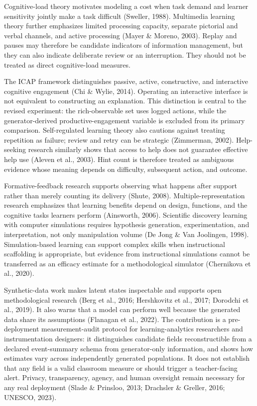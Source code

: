 \documentclass[11pt]{article}
\begin{document}
Cognitive-load theory motivates modeling a cost when task demand and learner sensitivity jointly make a task difficult (Sweller, 1988). Multimedia learning theory further emphasizes limited processing capacity, separate pictorial and verbal channels, and active processing (Mayer \& Moreno, 2003). Replay and pauses may therefore be candidate indicators of information management, but they can also indicate deliberate review or an interruption. They should not be treated as direct cognitive-load measures.

The ICAP framework distinguishes passive, active, constructive, and interactive cognitive engagement (Chi \& Wylie, 2014). Operating an interactive interface is not equivalent to constructing an explanation. This distinction is central to the revised experiment: the rich-observable set uses logged actions, while the generator-derived productive-engagement variable is excluded from its primary comparison. Self-regulated learning theory also cautions against treating repetition as failure; review and retry can be strategic (Zimmerman, 2002). Help-seeking research similarly shows that access to help does not guarantee effective help use (Aleven et al., 2003). Hint count is therefore treated as ambiguous evidence whose meaning depends on difficulty, subsequent action, and outcome.

Formative-feedback research supports observing what happens after support rather than merely counting its delivery (Shute, 2008). Multiple-representation research emphasizes that learning benefits depend on design, functions, and the cognitive tasks learners perform (Ainsworth, 2006). Scientific discovery learning with computer simulations requires hypothesis generation, experimentation, and interpretation, not only manipulation volume (De Jong \& Van Joolingen, 1998). Simulation-based learning can support complex skills when instructional scaffolding is appropriate, but evidence from instructional simulations cannot be transferred as an efficacy estimate for a methodological simulator (Chernikova et al., 2020).

Synthetic-data work makes latent states inspectable and supports open methodological research (Berg et al., 2016; Hershkovitz et al., 2017; Dorodchi et al., 2019). It also warns that a model can perform well because the generated data share its assumptions (Flanagan et al., 2022). The contribution is a pre-deployment measurement-audit protocol for learning-analytics researchers and instrumentation designers: it distinguishes candidate fields reconstructible from a declared event-summary schema from generator-only information, and shows how estimates vary across independently generated populations. It does not establish that any field is a valid classroom measure or should trigger a teacher-facing alert. Privacy, transparency, agency, and human oversight remain necessary for any real deployment (Slade \& Prinsloo, 2013; Drachsler \& Greller, 2016; UNESCO, 2023).
\end{document}
